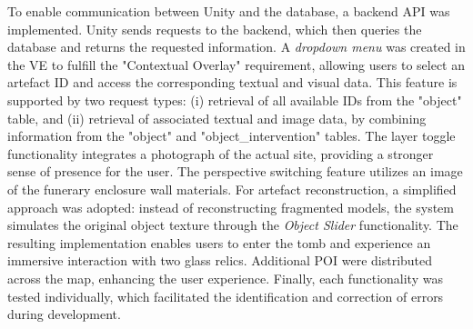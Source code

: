 To enable communication between Unity and the database, a backend \gls{API} was implemented. Unity sends requests to the backend, which then queries the database and returns the requested information. 
A \emph{dropdown menu} was created in the \gls{VE} to fulfill the "Contextual Overlay" requirement, allowing users to select an artefact \gls{ID} and access the corresponding textual and visual data. 
This feature is supported by two request types: (i) retrieval of all available \glspl{ID} from the "object" table, and (ii) retrieval of associated textual and image data, by combining information from the "object" and "object\_intervention" tables.
The layer toggle functionality integrates a photograph of the actual site, providing a stronger sense of presence for the user. The perspective switching feature utilizes an image of the funerary enclosure wall materials.
For artefact reconstruction, a simplified approach was adopted: instead of reconstructing fragmented models, the system simulates the original object texture through the \emph{Object Slider} functionality.
The resulting implementation enables users to enter the tomb and experience an immersive interaction with two glass relics. Additional \gls{POI} were distributed across the map, enhancing the user experience.
Finally, each functionality was tested individually, which facilitated the identification and correction of errors during development.
